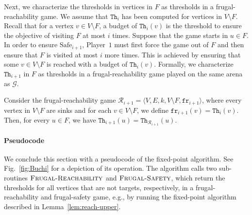 \documentclass{theoretics}
\newcommand{\Call}[2]{\ProcNameSty{#1}(#2)} %
\newcommand{\Calli}[1]{\textsc{#1}} %
\newcommand{\PO}{Player~$1$\xspace}
\newcommand{\G}{{\mathcal G}}
\newcommand{\R}{{\mathcal R}}
\renewcommand{\S}{{\mathcal S}}
\newcommand{\fr}{\texttt{fr}}
\newcommand{\notF}{V \setminus F}
\newcommand{\thresh}{\texttt{Th}\xspace}
\newcommand{\safe}{\text{Safe}}
\newcommand{\zug}[1]{\langle #1  \rangle}
\begin{document}
Next, we characterize the thresholds in vertices in $F$ as thresholds in a frugal-reachability game. 
We assume that $\thresh_{i}$ has been computed for vertices in $\notF$. 
Recall that for a vertex $v \in \notF$, a budget of $\thresh_{i}(v)$ is the threshold to ensure the objective of visiting $F$ at most $i$ times. 
Suppose that the game starts in $u \in F$. 
In order to ensure $\safe_{i+1}$, \PO must first force the game out of $F$ and then ensure that $F$ is visited at most $i$ more times. This is achieved by ensuring that some $v \in \notF$ is reached with a budget of $\thresh_{i}(v)$. Formally, we characterize $\thresh_{i+1}$ in $F$ as thresholds in a frugal-reachability game played on the same arena as $\G$. 


\begin{lemma}\label{lem: frugalreachtoSafei}
	Consider the frugal-reachability game $\R_{i+1} = \zug{V, E, k, \notF, \fr_{i+1}}$, where every vertex in \(V \setminus F\) are sinks and for each $v \in \notF$, we define $\fr_{i+1}(v) = \thresh_{i}(v)$. 
	Then, for every $u \in F$, we have $\thresh_{i+1}(u) = \thresh_{\R_{i+1}}(u)$. 
\end{lemma}



\paragraph*{Pseudocode} 
We conclude this section with a pseudocode of the fixed-point algorithm. See Fig.~\ref{fig:Buchi} for a depiction of its operation. 
The algorithm calls two sub-routines $\Calli{Frugal-Reachability}$ and $\Calli{Frugal-Safety}$, which return the thresholds for all vertices that are not targets, respectively, in a frugal-reachability and frugal-safety game, e.g., by running the fixed-point algorithm described in Lemma~\ref{lem:reach-upper}.




\end{document}
